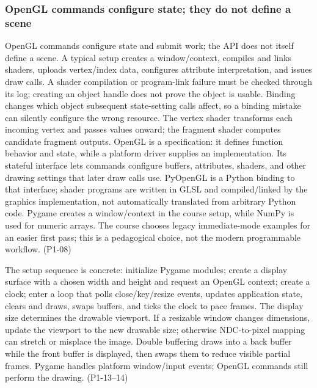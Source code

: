 \subsubsection{OpenGL commands configure state; they do not define a scene}\label{03-visual-computing-i-ch018-opengl-commands-configure-state-they-do-not-define-a-scene}

\hypertarget{03-visual-computing-i-ch018-opengl-commands-configure-state-they-do-not-define-a-scene}{}

OpenGL commands configure state and submit work; the API does not itself define a scene. A typical setup creates a window/context, compiles and links shaders, uploads vertex/index data, configures attribute interpretation, and issues draw calls. A shader compilation or program-link failure must be checked through its log; creating an object handle does not prove the object is usable. Binding changes which object subsequent state-setting calls affect, so a binding mistake can silently configure the wrong resource. The vertex shader transforms each incoming vertex and passes values onward; the fragment shader computes candidate fragment outputs. OpenGL is a specification: it defines function behavior and state, while a platform driver supplies an implementation. Its stateful interface lets commands configure buffers, attributes, shaders, and other drawing settings that later draw calls use. PyOpenGL is a Python binding to that interface; shader programs are written in GLSL and compiled/linked by the graphics implementation, not automatically translated from arbitrary Python code. Pygame creates a window/context in the course setup, while NumPy is used for numeric arrays. The course chooses legacy immediate-mode examples for an easier first pass; this is a pedagogical choice, not the modern programmable workflow. (P1-08)

The setup sequence is concrete: initialize Pygame modules; create a display surface with a chosen width and height and request an OpenGL context; create a clock; enter a loop that polls close/key/resize events, updates application state, clears and draws, swaps buffers, and ticks the clock to pace frames. The display size determines the drawable viewport. If a resizable window changes dimensions, update the viewport to the new drawable size; otherwise NDC-to-pixel mapping can stretch or misplace the image. Double buffering draws into a back buffer while the front buffer is displayed, then swaps them to reduce visible partial frames. Pygame handles platform window/input events; OpenGL commands still perform the drawing. (P1-13--14)

